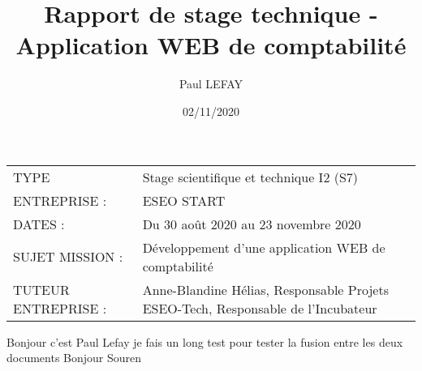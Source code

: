 \documentclass[twoside]{article}
\title{Rapport de stage technique - Application WEB de comptabilité}
\author{Paul LEFAY}
\date{02/11/2020}
\begin{document}
\cfoot{\thepage}

\maketitle{}										%

\begin{center}
	\begin{tabular}{ m{8cm} m{8cm} }
	TYPE & \mbox{\ooalign{$\checkmark$\cr\hidewidth$\square$\hidewidth\cr}}  Stage scientifique et technique I2 (S7) \\
   ENTREPRISE :  & ESEO START \\
   DATES : & Du 30 août 2020 au 23 novembre 2020 \\
   SUJET MISSION : & Développement d'une application WEB de comptabilité \\
   TUTEUR ENTREPRISE :  & Anne-Blandine Hélias, Responsable Projets ESEO-Tech, Responsable de l'Incubateur
 \end{tabular}
\end{center}

\newpage
Bonjour c'est Paul Lefay je fais un long test pour tester la fusion entre les deux documents 
Bonjour Souren 
\end{document}
